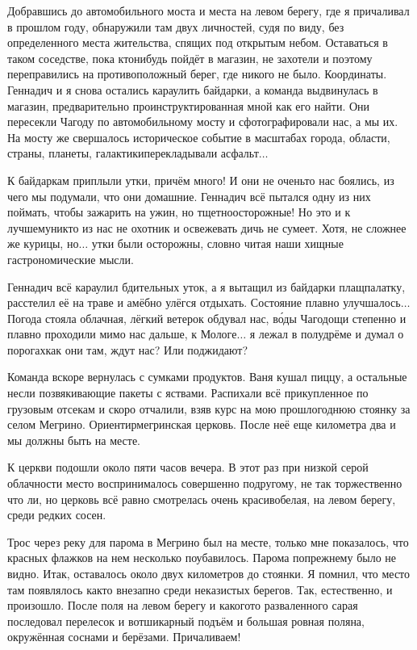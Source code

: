 Добравшись до автомобильного моста и места на левом берегу, где я причаливал в прошлом году, обнаружили там двух личностей, судя по виду, без определенного места жительства, спящих под открытым небом. Оставаться в таком соседстве, пока кто\sdash нибудь пойдёт в магазин, не захотели и поэтому переправились на противоположный берег, где никого не было. Координаты\mdash \CoordsChagodoschaSixteenGoToStore. Геннадич и я снова остались караулить байдарки, а команда выдвинулась в магазин, предварительно проинструктированная мной как его найти. Они пересекли Чагоду по автомобильному мосту и сфотографировали нас, а мы их. На мосту же свершалось историческое событие в масштабах города, области, страны, планеты, галактики\mdash  перекладывали асфальт$\ldots$ 

К байдаркам приплыли утки, причём много! И они не очень\sdash то нас боялись, из чего мы подумали, что они домашние. Геннадич всё пытался одну из них поймать, чтобы зажарить на ужин, но тщетно\mdash осторожные! Но это и к лучшему\mdash никто из нас не охотник и освежевать дичь не сумеет. Хотя, не сложнее же курицы, но$\ldots$ утки были осторожны, словно читая наши хищные гастрономические мысли.

Геннадич всё караулил бдительных уток, а я вытащил из байдарки плащ\sdash палатку, расстелил её на траве и амёбно улёгся отдыхать. Состояние плавно улучшалось$\ldots$ Погода стояла облачная, лёгкий ветерок обдувал нас, в\'{о}ды Чагодощи степенно и плавно проходили мимо нас дальше, к Мологе$\ldots$ я лежал в полудрёме и думал о порогах\mdash как они там, ждут нас? Или поджидают?

Команда вскоре вернулась с сумками продуктов. Ваня кушал пиццу, а остальные несли позвякивающие пакеты с яствами. Распихали всё прикупленное по грузовым отсекам и скоро отчалили, взяв курс на мою прошлогоднюю стоянку за селом Мегрино. Ориентир\mdash мегринская церковь. После неё еще километра два и мы должны быть на месте.

К церкви подошли около пяти часов вечера. В этот раз при низкой серой облачности место воспринималось совершенно по\sdash другому, не так торжественно что ли, но церковь всё равно смотрелась очень красиво\mdash белая, на левом берегу, среди редких сосен.
 
Трос через реку для парома в Мегрино был на месте, только мне показалось, что красных флажков на нем несколько поубавилось. Парома по\sdash прежнему было не видно. Итак, оставалось около двух километров до стоянки. Я помнил, что место там появлялось как\sdash то внезапно среди неказистых берегов. Так, естественно, и произошло. После поля на левом берегу и какого\sdash то разваленного сарая последовал перелесок и вот\mdash шикарный подъём и большая ровная поляна, окружённая соснами и берёзами. Причаливаем! 

